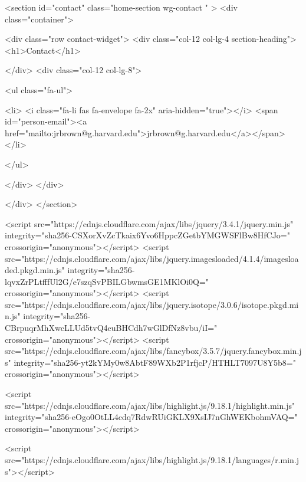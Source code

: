   <section id="contact" class="home-section wg-contact   "  >
    <div class="container">






<div class="row contact-widget">
  <div class="col-12 col-lg-4 section-heading">
    <h1>Contact</h1>

  </div>
  <div class="col-12 col-lg-8">




    <ul class="fa-ul">


      <li>
        <i class="fa-li fas fa-envelope fa-2x" aria-hidden="true"></i>
        <span id="person-email"><a href="mailto:jrbrown@g.harvard.edu">jrbrown@g.harvard.edu</a></span>
      </li>
















    </ul>



  </div>
</div>

    </div>
  </section>








      <script src="https://cdnjs.cloudflare.com/ajax/libs/jquery/3.4.1/jquery.min.js" integrity="sha256-CSXorXvZcTkaix6Yvo6HppcZGetbYMGWSFlBw8HfCJo=" crossorigin="anonymous"></script>
      <script src="https://cdnjs.cloudflare.com/ajax/libs/jquery.imagesloaded/4.1.4/imagesloaded.pkgd.min.js" integrity="sha256-lqvxZrPLtfffUl2G/e7szqSvPBILGbwmsGE1MKlOi0Q=" crossorigin="anonymous"></script>
      <script src="https://cdnjs.cloudflare.com/ajax/libs/jquery.isotope/3.0.6/isotope.pkgd.min.js" integrity="sha256-CBrpuqrMhXwcLLUd5tvQ4euBHCdh7wGlDfNz8vbu/iI=" crossorigin="anonymous"></script>
      <script src="https://cdnjs.cloudflare.com/ajax/libs/fancybox/3.5.7/jquery.fancybox.min.js" integrity="sha256-yt2kYMy0w8AbtF89WXb2P1rfjcP/HTHLT7097U8Y5b8=" crossorigin="anonymous"></script>





        <script src="https://cdnjs.cloudflare.com/ajax/libs/highlight.js/9.18.1/highlight.min.js" integrity="sha256-eOgo0OtLL4cdq7RdwRUiGKLX9XsIJ7nGhWEKbohmVAQ=" crossorigin="anonymous"></script>

        <script src="https://cdnjs.cloudflare.com/ajax/libs/highlight.js/9.18.1/languages/r.min.js"></script>







